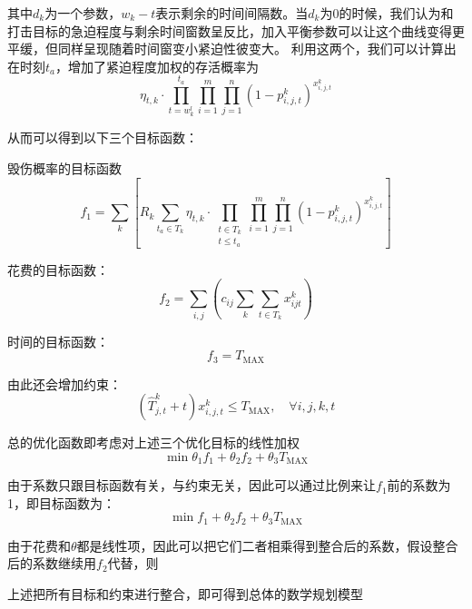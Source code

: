 其中$d_k$为一个参数，$w_k - t$表示剩余的时间间隔数。当$d_k$为0的时候，我们认为和打击目标的急迫程度与剩余时间窗数呈反比，加入平衡参数可以让这个曲线变得更平缓，但同样呈现随着时间窗变小紧迫性彼变大。
利用这两个，我们可以计算出在时刻$t_a$，增加了紧迫程度加权的存活概率为
\begin{equation*}
    \eta_{t,k} \cdot \prod_{t = w_k^l}^{t_a}\prod_{i = 1}^{m}\prod_{j=1}^{n}(1-p_{i,j,t}^k)^{x_{i,j,t}^k}
\end{equation*}

从而可以得到以下三个目标函数：

毁伤概率的目标函数
\begin{equation*}
    f_1 = \sum_{k} [ R_k \sum_{t_a \in T_k}{\eta_{t,k} \cdot \prod_{\substack{t \in T_k \\ t \leq t_a}}\prod_{i = 1}^{m}\prod_{j=1}^{n}(1-p_{i,j,t}^k)^{x_{i,j,t}^k}}]
\end{equation*}

花费的目标函数：
\begin{equation*}
    f_2 = \sum_{i,j}(c_{ij} \sum_{k}\sum_{t \in T_k}{x_{ijt}^k} )
\end{equation*}

时间的目标函数：
\begin{equation*}
    f_3 = T_{\mathrm{MAX}}
\end{equation*}

由此还会增加约束：
\begin{equation*}
    (\hat{T}_{j,t}^k + t) x_{i,j,t}^k \leq T_{\mathrm{MAX}},\quad \forall i, j, k, t
\end{equation*}

总的优化函数即考虑对上述三个优化目标的线性加权
\begin{equation*}
    \min \theta_1 f_1 + \theta_2 f_2 + \theta_3 T_{\mathrm{MAX}}
\end{equation*}

由于系数只跟目标函数有关，与约束无关，因此可以通过比例来让$f_1$前的系数为1，即目标函数为：
\begin{equation*}
    \min f_1 + \theta_2 f_2 + \theta_3 T_{\mathrm{MAX}}
\end{equation*}

由于花费和$\theta$都是线性项，因此可以把它们二者相乘得到整合后的系数，假设整合后的系数继续用$f_2$代替，则

上述把所有目标和约束进行整合，即可得到总体的数学规划模型

